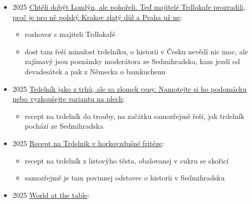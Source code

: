 \begin{itemize}
  \begin{itemize}
  \tightlist
  \item
    recept na trdelník z trouby
  \item
    ale i tady musí mít historický okýnko o původu v Sedmihradsku. omfg.
  \end{itemize}
\item
  2025
  \href{https://www.info.cz/podcasty/maxim-pavla-vondracka/starocesky-trdelnik-mytus-trdlokafe-expanze}{Chtěli
  dobýt Londýn, ale pohořeli. Teď majitelé Trdlokafe prozradili, proč je
  pro ně polský Krakov zlatý důl a Praha už ne}:

  \begin{itemize}
  \tightlist
  \item
    rozhovor s majiteli Trdlokafé
  \item
    dost tam řeší minulost trdelníku, o historii v Česku nevědí nic moc,
    ale zajímavý jsou poznámky moderátora ze Sedmihradska, kam jezdí od
    devadesátek a pak z Německa o bamkuchenu
  \end{itemize}
\item
  2025
  \href{https://www.kupi.cz/magazin/clanek/21114-recept-domaci-trdelnik}{Trdelník
  jako z trhů, ale za zlomek ceny. Namotejte si ho podomácku nebo
  vyzkoušejte variantu na plech}:

  \begin{itemize}
  \tightlist
  \item
    recept na trdelník do trouby, na začátku samozřejmě řeší, jak
    trdelník pochází ze Sedmihradska
  \end{itemize}
\item
  2025
  \href{https://horkovzdusnerecepty.cz/2025/11/03/recept-na-trdelnik-v-horkovzdusne-friteze/}{Recept
  na Trdelník v horkovzdušné fritéze}:

  \begin{itemize}
  \tightlist
  \item
    recept na trdelník z listovýho těsta, obalovanej v cukru se skořicí
  \item
    samozřejmě je tam povinnej odstavec o historii v Sedmihradsku
  \end{itemize}
\item
  2025
  \href{https://www.instagram.com/reel/DQj03TdCEjh/?utm_source=ig_web_copy_link&igsh=MzRlODBiNWFlZA==}{World
  at the table}:


\end{itemize}
